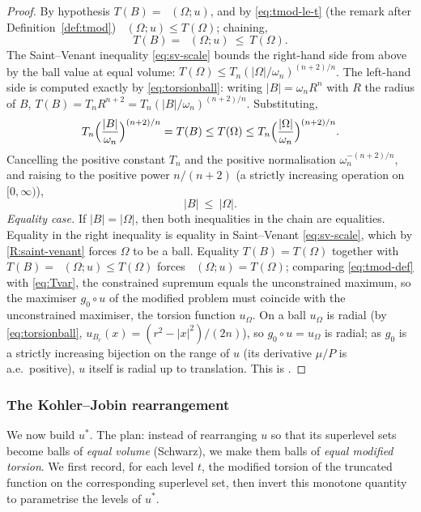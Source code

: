 \documentclass[11pt]{amsart}
\theoremstyle{definition}
\newcommand{\Om}{\Omega}
\newcommand{\abs}[1]{\left|#1\right|}
\DeclareMathOperator{\Tmod}{T_{\mathrm{mod}}}
\begin{document}
\begin{proof}
By hypothesis $T(B)=\Tmod(\Om;u)$, and by \eqref{eq:tmod-le-t} (the remark
after Definition~\ref{def:tmod}) $\Tmod(\Om;u)\le T(\Om)$; chaining,
\[
  T(B)=\Tmod(\Om;u)\ \le\ T(\Om).
\]
The Saint--Venant inequality \eqref{eq:sv-scale} bounds the right-hand side
from above by the ball value at equal volume:
$T(\Om)\le T_n(\abs\Om/\omega_n)^{(n+2)/n}$. The left-hand side is computed
exactly by \eqref{eq:torsionball}: writing $\abs B=\omega_n R^n$ with $R$
the radius of $B$, $T(B)=T_n R^{n+2}=T_n(\abs B/\omega_n)^{(n+2)/n}$.
Substituting,
\[
  T_n\Bigl(\frac{\abs B}{\omega_n}\Bigr)^{(n+2)/n}
  =T(B)\le T(\Om)\le
  T_n\Bigl(\frac{\abs\Om}{\omega_n}\Bigr)^{(n+2)/n}.
\]
Cancelling the positive constant $T_n$ and the positive normalisation
$\omega_n^{-(n+2)/n}$, and raising to the positive power $n/(n+2)$ (a
strictly increasing operation on $[0,\infty)$),
\[
  \abs B\ \le\ \abs\Om .
\]
\emph{Equality case.} If $\abs B=\abs\Om$, then both inequalities in the
chain are equalities. Equality in the right inequality is equality in
Saint--Venant \eqref{eq:sv-scale}, which by \ref{R:saint-venant} forces $\Om$
to be a ball. Equality $T(B)=T(\Om)$ together with
$T(B)=\Tmod(\Om;u)\le T(\Om)$ forces $\Tmod(\Om;u)=T(\Om)$; comparing
\eqref{eq:tmod-def} with \eqref{eq:Tvar}, the constrained supremum equals
the unconstrained maximum, so the maximiser $g_0\circ u$ of the modified
problem must coincide with the unconstrained maximiser, the torsion function
$u_\Om$. On a ball $u_\Om$ is radial (by \eqref{eq:torsionball},
$u_{B_r}(x)=(r^2-\abs x^2)/(2n)$), so $g_0\circ u=u_\Om$ is radial; as $g_0$
is a strictly increasing bijection on the range of $u$ (its derivative
$\mu/P$ is a.e.\ positive), $u$ itself is radial up to translation. This is
\cite[Prop.~3.8]{Brasco2014}.
\end{proof}

\subsubsection*{The Kohler--Jobin rearrangement}

We now build $u^*$. The plan: instead of rearranging $u$ so that its
superlevel sets become balls of \emph{equal volume} (Schwarz), we make them
balls of \emph{equal modified torsion}. We first record, for each level $t$,
the modified torsion of the truncated function on the corresponding
superlevel set, then invert this monotone quantity to parametrise the levels
of $u^*$.
\end{document}
